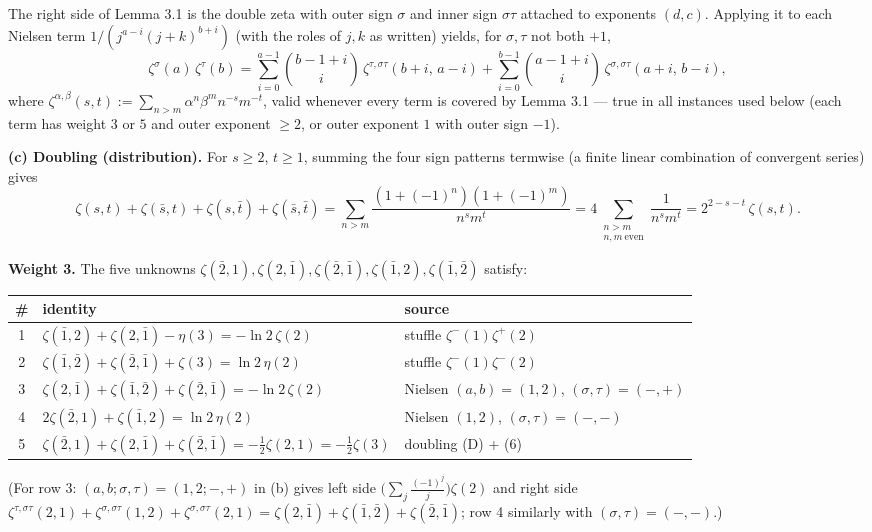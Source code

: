 \documentclass[11pt]{article}
\theoremstyle{remark}
\begin{document}
The right side of Lemma 3.1 is the double zeta with outer sign $\sigma$ and inner sign
$\sigma\tau$ attached to exponents $(d,c)$. Applying it to each Nielsen term
$1/(j^{a-i}(j+k)^{b+i})$ (with the roles of $j,k$ as written) yields, for $\sigma,\tau$ not both
$+1$,
\[
\zeta^{\sigma}(a)\,\zeta^{\tau}(b)=\sum_{i=0}^{a-1}\binom{b-1+i}{i}\,
\zeta^{\tau,\sigma\tau}(b+i,\,a-i)+\sum_{i=0}^{b-1}\binom{a-1+i}{i}\,
\zeta^{\sigma,\sigma\tau}(a+i,\,b-i),
\]
where $\zeta^{\alpha,\beta}(s,t):=\sum_{n>m}\alpha^n\beta^m n^{-s}m^{-t}$, valid whenever every
term is covered by Lemma 3.1 --- true in all instances used below (each term has weight $3$ or $5$
and outer exponent $\ge2$, or outer exponent $1$ with outer sign $-1$).

\textbf{(c) Doubling (distribution).} For $s\ge2$, $t\ge1$, summing the four sign patterns termwise
(a finite linear combination of convergent series) gives
\begin{equation}
\zeta(s,t)+\zeta(\bar s,t)+\zeta(s,\bar t)+\zeta(\bar s,\bar t)
=\sum_{n>m}\frac{(1+(-1)^n)(1+(-1)^m)}{n^sm^t}
=4\!\!\sum_{\substack{n>m\\ n,m\ \mathrm{even}}}\!\!\frac{1}{n^sm^t}
=2^{2-s-t}\,\zeta(s,t). \tag{D}
\end{equation}

\textbf{Weight 3.} The five unknowns $\zeta(\bar2,1),\zeta(2,\bar1),\zeta(\bar2,\bar1),\zeta(\bar1,2),
\zeta(\bar1,\bar2)$ satisfy:

\begin{center}
\begin{tabular}{|c|l|l|}
\hline
\# & identity & source \\
\hline
1 & $\zeta(\bar1,2)+\zeta(2,\bar1)-\eta(3)=-\ln2\,\zeta(2)$ & stuffle $\zeta^{-}(1)\zeta^{+}(2)$ \\
2 & $\zeta(\bar1,\bar2)+\zeta(\bar2,\bar1)+\zeta(3)=\ln2\,\eta(2)$ & stuffle $\zeta^{-}(1)\zeta^{-}(2)$ \\
3 & $\zeta(2,\bar1)+\zeta(\bar1,\bar2)+\zeta(\bar2,\bar1)=-\ln2\,\zeta(2)$ & Nielsen $(a,b)=(1,2)$, $(\sigma,\tau)=(-,+)$ \\
4 & $2\zeta(\bar2,1)+\zeta(\bar1,2)=\ln2\,\eta(2)$ & Nielsen $(1,2)$, $(\sigma,\tau)=(-,-)$ \\
5 & $\zeta(\bar2,1)+\zeta(2,\bar1)+\zeta(\bar2,\bar1)=-\tfrac12\zeta(2,1)=-\tfrac12\zeta(3)$ & doubling (D) + (6) \\
\hline
\end{tabular}
\end{center}

(For row 3: $(a,b;\sigma,\tau)=(1,2;-,+)$ in (b) gives left side $\big(\sum_j\tfrac{(-1)^j}{j}\big)\zeta(2)$
and right side $\zeta^{\tau,\sigma\tau}(2,1)+\zeta^{\sigma,\sigma\tau}(1,2)+\zeta^{\sigma,\sigma\tau}(2,1)
=\zeta(2,\bar1)+\zeta(\bar1,\bar2)+\zeta(\bar2,\bar1)$; row 4 similarly with $(\sigma,\tau)=(-,-)$.)
\end{document}
